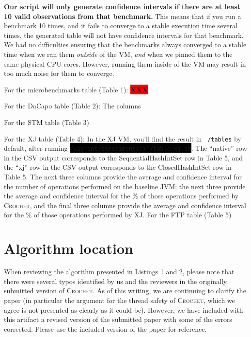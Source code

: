 \documentclass[12pt]{article}
\newcommand{\command}[1]{\colorbox{black}{\texttt{\color{white}#1}}}
\newcommand{\vm}[1]{\colorbox{green!20}{\texttt{\color{black}#1}}}
\newcommand{\XXX}{\colorbox{red}{\bf\color{white}XXX}}
\newcommand{\sysname}{\textsc{Crochet}\xspace}
\begin{document}
\textbf{Our script will only generate confidence intervals if there are at least 10 valid observations from that benchmark.} This means that if you run a benchmark 10 times, and it fails to converge to a stable execution time several times, the generated table will not have confidence intervals for that benchmark. We had no difficulties ensuring that the benchmarks always converged to a stable time when we ran them \emph{outside} of the VM, \emph{and} when we pinned them to the same physical CPU cores. However, running them inside of the VM may result in too much noise for them to converge.

For the microbenchmarks table (Table 1):
\XXX

For the DaCapo table (Table 2): The columns

For the STM table (Table 3)

For the XJ table (Table 4): In the XJ VM, you'll find the result in \vm{~/tables} by default, after running \command{/vagrant/experiments/xj/table-xj.sh}. The ``native'' row in the CSV output corresponds to the SequentialHashIntSet row in Table 5, and the ``xj'' row in the CSV output corresponds to the ClosedHashIntSet row in Table 5. The next three columns provide the average and confidence interval for the number of operations performed on the baseline JVM; the next three provide the average and confidence interval for the \% of those operations performed by \sysname, and the final three columns provide the average and confidence interval for the \% of those operations performed by XJ.
For the FTP table (Table 5)
\section{Algorithm location}
\label{sec:algorithm}

When reviewing the algorithm presented in Listings 1 and 2, please note that there were several typos identified by us and the reviewers in the originally submitted version of \sysname. As of this writing, we are continuing to clarify the paper (in particular the argument for the thread safety of \sysname, which we agree is not presented as clearly as it could be). However, we have included with this artifact a revised version of the submitted paper with some of the errors corrected. Please use the included version of the paper for reference.
\end{document}
